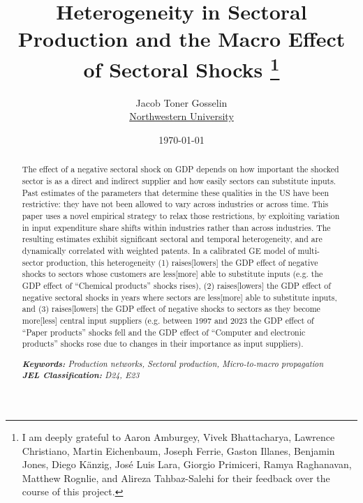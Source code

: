 \documentclass[11pt]{article}
\title{\textbf{Heterogeneity in Sectoral Production and the Macro Effect of Sectoral Shocks}
\thanks{I am deeply grateful to Aaron Amburgey, Vivek Bhattacharya, Lawrence Christiano, Martin Eichenbaum, Joseph Ferrie, Gaston Illanes, Benjamin Jones, Diego Känzig, José Luis Lara, Giorgio Primiceri, Ramya Raghanavan, Matthew Rognlie, and Alireza Tahbaz-Salehi for their feedback over the course of this project.}}
\author{Jacob Toner Gosselin\\%
    \href{mailto:jacob.gosselin@u.northwestern.edu}{Northwestern University} %
    }
\date{\today}
\begin{document}
\captionsetup{justification=centering, singlelinecheck=false}
\vfill
{
\maketitle
\begin{abstract}

The effect of a negative sectoral shock on GDP depends on how important the shocked sector is as a direct and indirect supplier and how easily sectors can substitute inputs. Past estimates of the parameters that determine these qualities in the US have been restrictive: they have not been allowed to vary across industries or across time. This paper uses a novel empirical strategy to relax those restrictions, by exploiting variation in input expenditure share shifts within industries rather than across industries. The resulting estimates exhibit significant sectoral and temporal heterogeneity, and are dynamically correlated with weighted patents. In a calibrated GE model of multi-sector production, this heterogeneity (1) raises[lowers] the GDP effect of negative shocks to sectors whose customers are less[more] able to substitute inputs (e.g. the GDP effect of ``Chemical products'' shocks rises), (2) raises[lowers] the GDP effect of negative sectoral shocks in years where sectors are less[more] able to substitute inputs, and (3) raises[lowers] the GDP effect of negative shocks to sectors as they become more[less] central input suppliers (e.g. between 1997 and 2023 the GDP effect of ``Paper products'' shocks fell and the GDP effect of ``Computer and electronic products'' shocks rose due to changes in their importance as input suppliers). 

\noindent
\textit{\textbf{Keywords: }%
Production networks, Sectoral production, Micro-to-macro propagation} \\ %
\noindent
\textit{\textbf{JEL Classification: }%
D24, E23} %
\end{abstract}
}
\vfill


\end{document}
